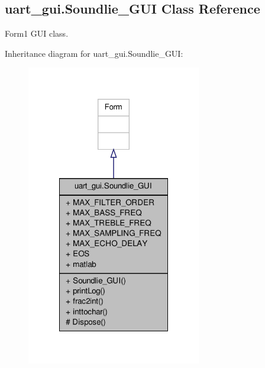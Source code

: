 \hypertarget{classuart__gui_1_1_soundlie___g_u_i}{\subsection{uart\-\_\-gui.\-Soundlie\-\_\-\-G\-U\-I Class Reference}
\label{classuart__gui_1_1_soundlie___g_u_i}
}


Form1 G\-U\-I class.  




Inheritance diagram for uart\-\_\-gui.\-Soundlie\-\_\-\-G\-U\-I\-:\nopagebreak
\begin{figure}[H]
\begin{center}
\leavevmode
\includegraphics[width=216pt]{df/d32/classuart__gui_1_1_soundlie___g_u_i__inherit__graph}
\end{center}
\end{figure}



